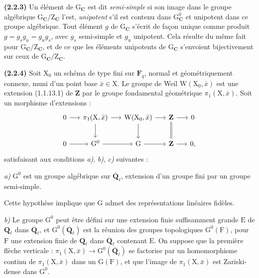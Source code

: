 \documentclass[11pt,leqno]{article}
\begin{document}
\textbf{(2.2.3)} Un élément de \(\mathrm G_{\mathbf C}\) est dit \textit{semi-simple} si son image dans le groupe algébrique \(\mathrm G_{\mathbf C}/\mathrm Z_{\mathbf C}\) l’est, \textit{unipotent} s’il est contenu dans \(\mathrm G_{\mathbf C}^0\) et unipotent dans ce groupe algébrique. Tout élément \(g\) de \(\mathrm G_{\mathbf C}\) s’écrit de façon unique comme produit \(g=g_sg_u=g_ug_s\), avec \(g_s\) semi-simple et \(g_u\) unipotent. Cela résulte du même fait pour \(\mathrm G_{\mathbf C}/\mathrm Z_{\mathbf C}\), et de ce que les éléments unipotents de \(\mathrm G_{\mathbf C}\) s’envoient bijectivement sur ceux de \(\mathrm G_{\mathbf C}/\mathrm Z_{\mathbf C}\).

\textbf{(2.2.4)} Soit \(\mathrm X_0\) un schéma de type fini sur \(\mathbf F_q\), normal et géométriquement connexe, muni d’un point base \(\bar{x}\in\mathrm X\). Le groupe de Weil \(\mathrm W(\mathrm X_0,\bar{x})\) est une extension (1.1.13.1) de \(\mathbf Z\) par le groupe fondamental géométrique \(\pi_1(\mathrm X,\bar{x})\). Soit un morphisme d’extensions :
\[
\begin{tikzcd}[ampersand replacement=\&, column sep=1.5em, row sep=2em]
0 \arrow[r] \&
\pi_1(\mathrm X,\bar{x}) \arrow[r] \arrow[d] \&
\mathrm W(\mathrm X_0,\bar{x}) \arrow[r] \arrow[d] \&
\mathbf Z \arrow[r] \arrow[d,equal] \& 0 \\
0 \arrow[r] \&
\mathrm G^0 \arrow[r] \&
\mathrm G \arrow[r] \&
\mathbf Z \arrow[r] \& 0,
\end{tikzcd}
\]
satisfaisant aux conditions \textit{a)}, \textit{b)}, \textit{c)} suivantes :

\textit{a)} \(\mathrm G^0\) est un groupe algébrique sur \(\overline{\mathbf Q}_\ell\), extension d’un groupe fini par un groupe semi-simple.

Cette hypothèse implique que \(\mathrm G\) admet des représentations linéaires fidèles.

\textit{b)} Le groupe \(\mathrm G^0\) peut être défini sur une extension finie suffisamment grande \(\mathrm E\) de \(\mathbf Q_\ell\) dans \(\overline{\mathbf Q}_\ell\), et \(\mathrm G^0(\overline{\mathbf Q}_\ell)\) est la réunion des groupes topologiques \(\mathrm G^0(\mathrm F)\), pour \(\mathrm F\) une extension finie de \(\mathbf Q_\ell\) dans \(\overline{\mathbf Q}_\ell\) contenant \(\mathrm E\). On suppose que la première flèche verticale : \(\pi_1(\mathrm X,\bar{x})\to\mathrm G^0(\overline{\mathbf Q}_\ell)\) se factorise par un homomorphisme continu de \(\pi_1(\mathrm X,\bar{x})\) dans un \(\mathrm G(\mathrm F)\), et que l’image de \(\pi_1(\mathrm X,\bar{x})\) est Zariski-dense dans \(\mathrm G^0\).
\end{document}
